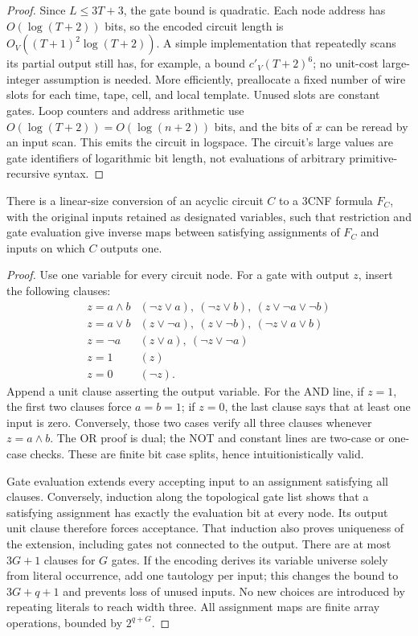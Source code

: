 \begin{proof}
Since $L\le 3T+3$, the gate bound is quadratic. Each node address has
$O(\log(T+2))$ bits, so the encoded circuit length is
$O_V((T+1)^2\log(T+2))$. A simple implementation that repeatedly scans its
partial output still has, for example, a bound $c'_V(T+2)^6$; no unit-cost
large-integer assumption is needed. More efficiently, preallocate a fixed
number of wire slots for each time, tape, cell, and local template. Unused
slots are constant gates. Loop counters and address arithmetic use
$O(\log(T+2))=O(\log(n+2))$ bits, and the bits of $x$ can be reread by an
input scan. This emits the circuit in logspace. The circuit's large values
are gate identifiers of logarithmic bit length, not evaluations of arbitrary
primitive-recursive syntax.
\end{proof}

\begin{theorem}\label{thm:N04}
There is a linear-size conversion of an acyclic circuit $C$ to a 3CNF formula
$F_C$, with the original inputs retained as designated variables, such that
restriction and gate evaluation give inverse maps between satisfying
assignments of $F_C$ and inputs on which $C$ outputs one.
\end{theorem}
\begin{proof}
Use one variable for every circuit node. For a gate with output $z$, insert
the following clauses:
\[
\begin{array}{c|l}
 z=a\wedge b & (\neg z\vee a),\ (\neg z\vee b),\ (z\vee\neg a\vee\neg b)\\
 z=a\vee b & (z\vee\neg a),\ (z\vee\neg b),\ (\neg z\vee a\vee b)\\
 z=\neg a & (z\vee a),\ (\neg z\vee\neg a)\\
 z=1 & (z)\\
 z=0 & (\neg z).
\end{array}
\]
Append a unit clause asserting the output variable. For the AND line, if
$z=1$, the first two clauses force $a=b=1$; if $z=0$, the last clause says
that at least one input is zero. Conversely, those two cases verify all
three clauses whenever $z=a\wedge b$. The OR proof is dual; the NOT and
constant lines are two-case or one-case checks. These are finite bit case
splits, hence intuitionistically valid.

Gate evaluation extends every accepting input to an assignment satisfying
all clauses. Conversely, induction along the topological gate list shows
that a satisfying assignment has exactly the evaluation bit at every node.
Its output unit clause therefore forces acceptance. That induction also
proves uniqueness of the extension, including gates not connected to the
output. There are at most $3G+1$ clauses for $G$ gates. If the encoding derives
its variable universe solely from literal occurrence, add one tautology per
input; this changes the bound to $3G+q+1$ and prevents loss of unused inputs.
No new choices are introduced by repeating literals to reach width three.
All assignment maps are finite array operations, bounded by $2^{q+G}$.
\end{proof}


